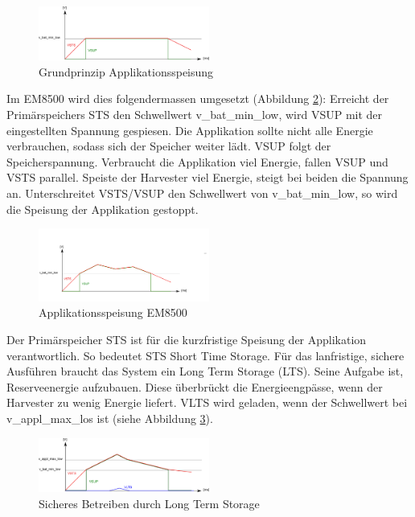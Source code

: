\begin{figure}[ht]
   \includegraphics[width=0.5\textwidth]{2TheoretischeGrundlagen/imag/levelMitSTsTheoriel.png}
   \caption{Grundprinzip Applikationsspeisung }
   \label{em_grundprinzip} 
\end{figure}

Im EM8500 wird dies folgendermassen umgesetzt (Abbildung \ref{em_grundprinzip_em8500}): Erreicht der Primärspeichers STS den Schwellwert v\_bat\_min\_low, wird VSUP mit der eingestellten Spannung gespiesen. Die Applikation sollte nicht alle Energie verbrauchen, sodass sich der Speicher weiter lädt. VSUP folgt der Speicherspannung. Verbraucht die Applikation viel Energie, fallen VSUP und VSTS parallel. Speiste der Harvester viel Energie, steigt bei beiden die Spannung an. Unterschreitet VSTS/VSUP den Schwellwert von v\_bat\_min\_low, so wird die Speisung der Applikation gestoppt.


\begin{figure}[ht]
   \includegraphics[width=0.5\textwidth]{2TheoretischeGrundlagen/imag/levelSTSReal.png}
   \caption{Applikationsspeisung EM8500}
   \label{em_grundprinzip_em8500} 
\end{figure}

Der Primärspeicher STS ist für die kurzfristige Speisung der Applikation verantwortlich. So bedeutet STS Short Time Storage. Für das lanfristige, sichere Ausführen braucht das System ein Long Term Storage (LTS). Seine Aufgabe ist, Reserveenergie aufzubauen. Diese überbrückt die Energieengpässe, wenn der Harvester zu wenig Energie liefert.
VLTS wird geladen, wenn der Schwellwert bei v\_appl\_max\_los ist (siehe Abbildung \ref{energiespeisung_lts}).

\begin{figure}[ht]
   \includegraphics[width=0.5\textwidth]{2TheoretischeGrundlagen/imag/levelMitLTS.png}
   \caption{Sicheres Betreiben durch Long Term Storage}
   \label{energiespeisung_lts} 
\end{figure}

